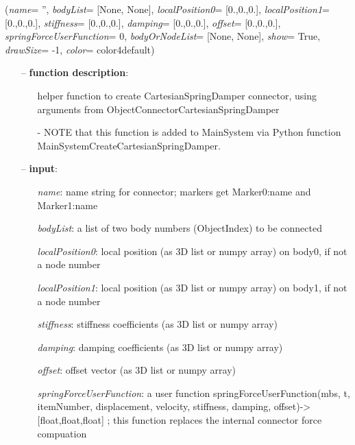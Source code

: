 %
\begin{flushleft}
\label{sec:mainsystemextensions:CreateCartesianSpringDamper}
({\it name}= '', {\it bodyList}= [None, None], {\it localPosition0}= [0.,0.,0.], {\it localPosition1}= [0.,0.,0.], {\it stiffness}= [0.,0.,0.], {\it damping}= [0.,0.,0.], {\it offset}= [0.,0.,0.], {\it springForceUserFunction}= 0, {\it bodyOrNodeList}= [None, None], {\it show}= True, {\it drawSize}= -1, {\it color}= color4default)
\end{flushleft}
\setlength{\itemindent}{0.7cm}
\begin{itemize}[leftmargin=0.7cm]
\item[--]
{\bf function description}: \vspace{-6pt}
\begin{itemize}[leftmargin=1.2cm]
\setlength{\itemindent}{-0.7cm}
\item[]helper function to create CartesianSpringDamper connector, using arguments from ObjectConnectorCartesianSpringDamper
\item[]- NOTE that this function is added to MainSystem via Python function MainSystemCreateCartesianSpringDamper.
\end{itemize}
\item[--]
{\bf input}: \vspace{-6pt}
\begin{itemize}[leftmargin=1.2cm]
\setlength{\itemindent}{-0.7cm}
\item[]{\it name}: name string for connector; markers get Marker0:name and Marker1:name
\item[]{\it bodyList}: a list of two body numbers (ObjectIndex) to be connected
\item[]{\it localPosition0}: local position (as 3D list or numpy array) on body0, if not a node number
\item[]{\it localPosition1}: local position (as 3D list or numpy array) on body1, if not a node number
\item[]{\it stiffness}: stiffness coefficients (as 3D list or numpy array)
\item[]{\it damping}: damping coefficients (as 3D list or numpy array)
\item[]{\it offset}: offset vector (as 3D list or numpy array)
\item[]{\it springForceUserFunction}: a user function springForceUserFunction(mbs, t, itemNumber, displacement, velocity, stiffness, damping, offset)->[float,float,float] ; this function replaces the internal connector force compuation

\end{itemize}
\end{itemize}
